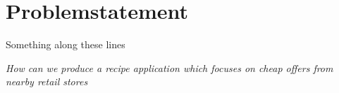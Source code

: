 \section{Problemstatement}
\label{sec:probstate}

Something along these lines

\emph{How can we produce a recipe application which focuses on cheap offers from nearby retail stores}

